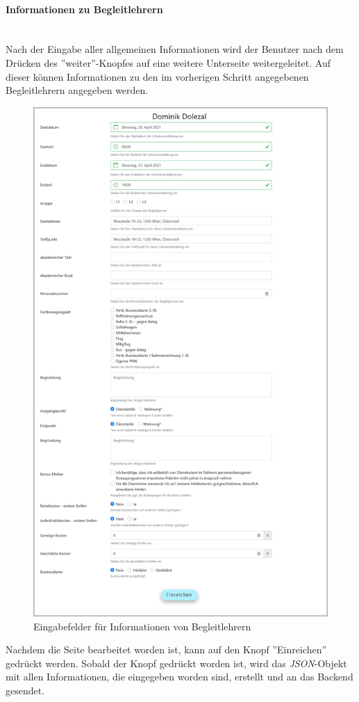 \paragraph{Informationen zu Begleitlehrern}~
\label{code_submit_data}~\\
Nach der Eingabe aller allgemeinen Informationen wird der Benutzer nach dem Drücken des ''weiter''-Knopfes auf eine weitere Unterseite weitergeleitet. Auf dieser können Informationen zu den im vorherigen Schritt angegebenen Begleitlehrern angegeben werden.
\begin{figure}[H]
	\centering
	\includegraphics[width=0.7\linewidth]{images/rfoster_implementierung/escorts}
	\caption[Schulveranstaltung 2]{Eingabefelder für Informationen von Begleitlehrern}
	\label{fig:escorts}
\end{figure}
\newpage
Nachdem die Seite bearbeitet worden ist, kann auf den Knopf ''Einreichen'' gedrückt werden. Sobald der Knopf gedrückt worden ist, wird das \textit{JSON}-Objekt mit allen Informationen, die eingegeben worden sind, erstellt und an das Backend gesendet.
